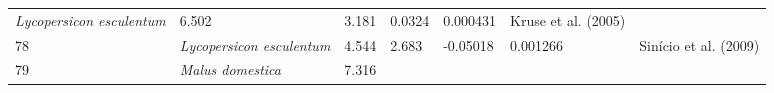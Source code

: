 \documentclass[]{article}
\begin{document}
\begin{longtable}[]{@{}lllllll@{}}
\begin{minipage}[t]{0.23\columnwidth}
\emph{Lycopersicon esculentum}\strut
\end{minipage} & \begin{minipage}[t]{0.05\columnwidth}\raggedright
6.502\strut
\end{minipage} & \begin{minipage}[t]{0.08\columnwidth}\raggedright
3.181\strut
\end{minipage} & \begin{minipage}[t]{0.08\columnwidth}\raggedright
0.0324\strut
\end{minipage} & \begin{minipage}[t]{0.08\columnwidth}\raggedright
0.000431\strut
\end{minipage} & \begin{minipage}[t]{0.23\columnwidth}\raggedright
Kruse et al. (2005)\strut
\end{minipage}\tabularnewline
\begin{minipage}[t]{0.05\columnwidth}\raggedright
78\strut
\end{minipage} & \begin{minipage}[t]{0.23\columnwidth}\raggedright
\emph{Lycopersicon esculentum}\strut
\end{minipage} & \begin{minipage}[t]{0.05\columnwidth}\raggedright
4.544\strut
\end{minipage} & \begin{minipage}[t]{0.08\columnwidth}\raggedright
2.683\strut
\end{minipage} & \begin{minipage}[t]{0.08\columnwidth}\raggedright
-0.05018\strut
\end{minipage} & \begin{minipage}[t]{0.08\columnwidth}\raggedright
0.001266\strut
\end{minipage} & \begin{minipage}[t]{0.23\columnwidth}\raggedright
Sinício et al. (2009)\strut
\end{minipage}\tabularnewline
\begin{minipage}[t]{0.05\columnwidth}\raggedright
79\strut
\end{minipage} & \begin{minipage}[t]{0.23\columnwidth}\raggedright
\emph{Malus domestica}\strut
\end{minipage} & \begin{minipage}[t]{0.05\columnwidth}\raggedright
7.316\strut
\end{minipage} & \begin{minipage}[t]{0.08\columnwidth}\raggedright

\end{minipage}
\end{longtable}
\end{document}
